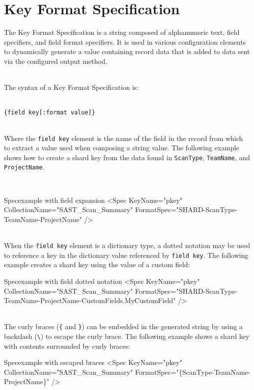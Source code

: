 \chapter{Key Format Specification}\label{chap:key_format_spec}

The Key Format Specification is a string composed of alphanumeric text, field specifiers, and field format specifiers.  It is used in various configuration
elements to dynamically generate a value containing record data that is added to data sent via the configured output method.

\noindent\\The syntax of a Key Format Specification is:

\noindent\\\texttt{\{field key[:format value]\}}

\noindent\\Where the \texttt{field key} element is the name of the field in the record from which to extract a value used when composing a string value.
The following example shows how to create a shard key from the data found in \texttt{ScanType}, \texttt{TeamName}, and \texttt{ProjectName}.

\noindent\\
\begin{xml}{Spec}{example with field expansion}{}
<Spec KeyName="pkey" CollectionName="SAST_Scan_Summary" 
    FormatSpec="SHARD-{ScanType}-{TeamName}-{ProjectName}"  />
\end{xml}


\noindent\\When the \texttt{field key} element is a dictionary type, a dotted notation may be used to reference a key in the dictionary
value referenced by \texttt{field key}.  The following example creates a shard key using the value of a custom field:

\begin{xml}{Spec}{example with field dotted notation}{}
<Spec KeyName="pkey" CollectionName="SAST_Scan_Summary" 
    FormatSpec="SHARD-{ScanType}-{TeamName}-{ProjectName}-{CustomFields.MyCustomField}"
    />
\end{xml}


\noindent\\The curly braces (\texttt{\{} and \texttt{\}}) can be embedded in the generated string by using a backslash (\texttt{\textbackslash}) to escape 
the curly brace.  The following example shows a shard key with contents surrounded by curly braces:

\begin{xml}{Spec}{example with escaped braces}{}
<Spec KeyName="pkey" CollectionName="SAST_Scan_Summary"
    FormatSpec="\{{ScanType}-{TeamName}-{ProjectName}\}"  />
\end{xml}

